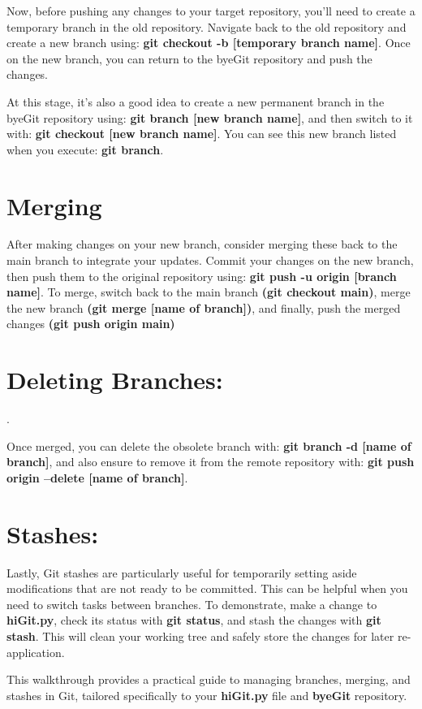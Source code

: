 \documentclass[10pt,twocolumn]{article}
\begin{document}
Now, before pushing any changes to your target repository, you'll need to create a temporary branch in the old repository. Navigate back to the old repository and create a new branch using: \textbf{git checkout -b [temporary branch name]}. Once on the new branch, you can return to the byeGit repository and push the changes.

At this stage, it's also a good idea to create a new permanent branch in the byeGit repository using: \textbf{git branch [new branch name]}, and then switch to it with: \textbf{git checkout [new branch name]}. You can see this new branch listed when you execute: \textbf{git branch}.

\section{Merging}

After making changes on your new branch, consider merging these back to the main branch to integrate your updates. Commit your changes on the new branch, then push them to the original repository using: \textbf{git push -u origin [branch name]}. To merge, switch back to the main branch \textbf{(git checkout main)}, merge the new branch \textbf{(git merge [name of branch])}, and finally, push the merged changes \textbf{(git push origin main)}

\section{Deleting Branches:}.

Once merged, you can delete the obsolete branch with: \textbf{git branch -d [name of branch]}, and also ensure to remove it from the remote repository with: \textbf{git push origin --delete [name of branch]}.

\section{Stashes:}

Lastly, Git stashes are particularly useful for temporarily setting aside modifications that are not ready to be committed. This can be helpful when you need to switch tasks between branches. To demonstrate, make a change to \textbf{hiGit.py}, check its status with \textbf{git status}, and stash the changes with \textbf{git stash}. This will clean your working tree and safely store the changes for later re-application.

This walkthrough provides a practical guide to managing branches, merging, and stashes in Git, tailored specifically to your \textbf{hiGit.py} file and \textbf{byeGit} repository.




\printbibliography
\end{document}
